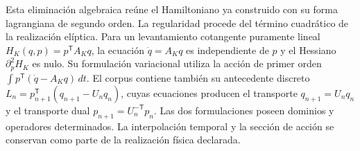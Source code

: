 Esta eliminación algebraica reúne el Hamiltoniano ya construido con
su forma lagrangiana de segundo orden. La regularidad procede del
término cuadrático de la realización elíptica. Para un levantamiento
cotangente puramente lineal \(H_K(q,p)=p^{\mathsf T}A_Kq\), la
ecuación \(\dot q=A_Kq\) es independiente de \(p\) y el Hessiano
\(\partial_p^2H_K\) es nulo. Su formulación variacional utiliza la
acción de primer orden \(\int p^{\mathsf T}(\dot q-A_Kq)\,dt\).
El corpus contiene también su antecedente discreto
\(L_n=p_{n+1}^{\mathsf T}(q_{n+1}-U_nq_n)\), cuyas ecuaciones
producen el transporte \(q_{n+1}=U_nq_n\) y el transporte dual
\(p_{n+1}=U_n^{-\mathsf T}p_n\). Las dos formulaciones poseen
dominios y operadores determinados. La interpolación temporal y la
sección de acción se conservan como parte de la realización física
declarada.

